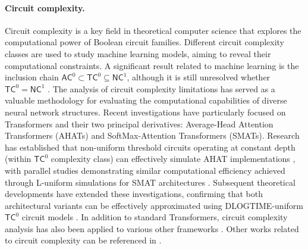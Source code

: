 \paragraph{Circuit complexity.} Circuit complexity is a key field in theoretical computer science that explores the computational power of Boolean circuit families. Different circuit complexity classes are used to study machine learning models, aiming to reveal their computational constraints. A significant result related to machine learning is the inclusion chain $\mathsf{AC}^0 \subset \mathsf{TC}^0 \subseteq \mathsf{NC}^1$, although it is still unresolved whether $\mathsf{TC}^0 = \mathsf{NC}^1$ \cite{v99,ab09}. 
The analysis of circuit complexity limitations has served as a valuable methodology for evaluating the computational capabilities of diverse neural network structures. Recent investigations have particularly focused on Transformers and their two principal derivatives: Average-Head Attention Transformers (AHATs) and SoftMax-Attention Transformers (SMATs). Research has established that non-uniform threshold circuits operating at constant depth (within $\mathsf{TC}^0$ complexity class) can effectively simulate AHAT implementations \cite{mss22}, with parallel studies demonstrating similar computational efficiency achieved through L-uniform simulations for SMAT architectures \cite{lag+22}. Subsequent theoretical developments have extended these investigations, confirming that both architectural variants can be effectively approximated using \textsf{DLOGTIME}-uniform $\mathsf{TC}^0$ circuit models \cite{ms24}.
In addition to standard Transformers, circuit complexity analysis has also been applied to various other frameworks \cite{cll+24_mamba_circut,kll+25_circuit_var}. Other works related to circuit complexity can be referenced in \cite{cll+24,cll+24_tensor_tc,lll+24_hopfield_tc,cll+25_mamba_tc,lls+25,lls+25_grok}.

